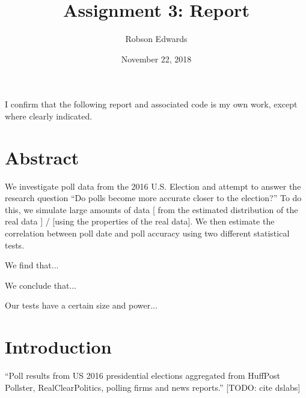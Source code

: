 \documentclass[11pt, oneside]{article}
\title{Assignment 3: Report}
\author{Robson Edwards}
\date{November 22, 2018}
\begin{document}
\maketitle

I confirm that the following report and associated code is my own work, except where clearly indicated.


\section*{Abstract}

We investigate poll data from the 2016 U.S. Election and attempt to answer the research question ``Do polls become more accurate closer to the election?'' To do this, we simulate large amounts of data [ from the estimated distribution of the real data ] / [using the properties of the real data]. 
We then estimate the correlation between poll date and poll accuracy using two different statistical tests. 

We find that... %

We conclude that... %

Our tests have a certain size and power... %

\section{Introduction}

``Poll results from US 2016 presidential elections aggregated from HuffPost Pollster, RealClearPolitics, polling firms and news reports.'' [TODO: cite dslabs]

\end{document}
